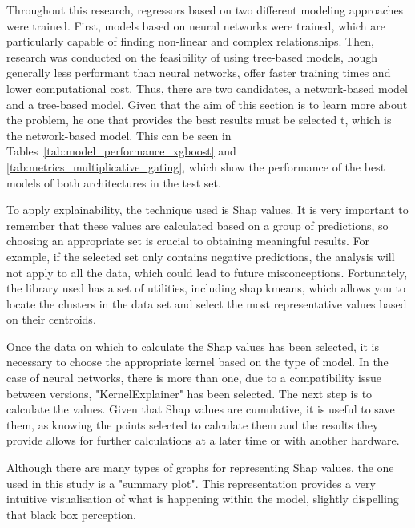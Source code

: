 Throughout this research, regressors based on two different modeling approaches were trained. First, models based on neural networks were trained, which are particularly capable of finding non-linear and complex relationships. Then, research was conducted on the feasibility of using tree-based models, hough generally less performant than neural networks, offer faster training times and lower computational cost. Thus, there are two candidates, a network-based model and a tree-based model. Given that the aim of this section is to learn more about the problem, he one that provides the best results must be selected t, which is the network-based model. This can be seen in Tables~\ref{tab:model_performance_xgboost} and \ref{tab:metrics_multiplicative_gating}, which show the performance of the best models of both architectures in the test set.


To apply explainability, the technique used is Shap values. It is very important to remember that these values are calculated based on a group of predictions, so choosing an appropriate set is crucial to obtaining meaningful results. For example, if the selected set only contains negative predictions, the analysis will not apply to all the data, which could lead to future misconceptions. Fortunately, the library used has a set of utilities, including shap.kmeans, which allows you to locate the clusters in the data set and select the most representative values based on their centroids.

Once the data on which to calculate the Shap values has been selected, it is necessary to choose the appropriate kernel based on the type of model. In the case of neural networks, there is more than one, due to a compatibility issue between versions, "KernelExplainer" has been selected. The next step is to calculate the values. Given that Shap values are cumulative, it is useful to save them, as knowing the points selected to calculate them and the results they provide allows for further calculations at a later time or with another hardware.

Although there are many types of graphs for representing Shap values, the one used in this study is a "summary plot". This representation provides a very intuitive visualisation of what is happening within the model, slightly dispelling that black box perception.

